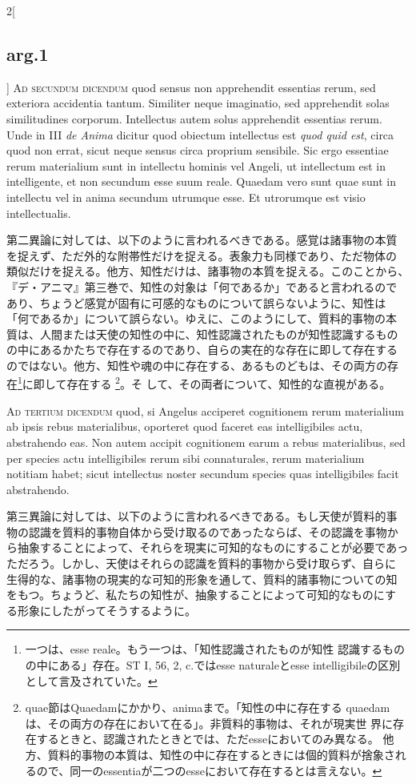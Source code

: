 \documentclass[paper=a4paper,fontsize=10pt,jafontsize=9pt,titlepage]{jlreq}
\begin{document}
\begin{paracol}{2}[\subsection{arg.1}]
{\scshape Ad secundum dicendum} quod sensus non apprehendit essentias
rerum, sed exteriora accidentia tantum. Similiter neque imaginatio,
sed apprehendit solas similitudines corporum. Intellectus autem solus
apprehendit essentias rerum. Unde in III {\itshape de Anima} dicitur
quod obiectum intellectus est {\itshape quod quid est}, circa quod non
errat, sicut neque sensus circa proprium sensibile. Sic ergo essentiae
rerum materialium sunt in intellectu hominis vel Angeli, ut
intellectum est in intelligente, et non secundum esse suum
reale. Quaedam vero sunt quae sunt in intellectu vel in anima secundum
utrumque esse. Et utrorumque est visio intellectualis.

\switchcolumn

第二異論に対しては、以下のように言われるべきである。感覚は諸事物の本質
を捉えず、ただ外的な附帯性だけを捉える。表象力も同様であり、ただ物体の
類似だけを捉える。他方、知性だけは、諸事物の本質を捉える。このことから、
『デ・アニマ』第三巻で、知性の対象は「何であるか」であると言われるので
あり、ちょうど感覚が固有に可感的なものについて誤らないように、知性は
「何であるか」について誤らない。ゆえに、このようにして、質料的事物の本
質は、人間または天使の知性の中に、知性認識されたものが知性認識するもの
の中にあるかたちで存在するのであり、自らの実在的な存在に即して存在する
のではない。他方、知性や魂の中に存在する、あるものどもは、その両方の存
在\footnote{一つは、esse reale。もう一つは、「知性認識されたものが知性
認識するものの中にある」存在。ST I, 56, 2, c.ではesse naturaleとesse
intelligibileの区別として言及されていた。}に即して存在する
\footnote{quae節はQuaedamにかかり、animaまで。「知性の中に存在する
quaedamは、その両方の存在において在る」。非質料的事物は、それが現実世
界に存在するときと、認識されたときとでは、ただesseにおいてのみ異なる。
他方、質料的事物の本質は、知性の中に存在するときには個的質料が捨象され
るので、同一のessentiaが二つのesseにおいて存在するとは言えない。}。そ
して、その両者について、知性的な直視がある。

\switchcolumn*[\subsection{ad.3}]

{\scshape Ad tertium dicendum} quod, si Angelus acciperet cognitionem
rerum materialium ab ipsis rebus materialibus, oporteret quod faceret
eas intelligibiles actu, abstrahendo eas. Non autem accipit
cognitionem earum a rebus materialibus, sed per species actu
intelligibiles rerum sibi connaturales, rerum materialium notitiam
habet; sicut intellectus noster secundum species quas intelligibiles
facit abstrahendo.

\switchcolumn

第三異論に対しては、以下のように言われるべきである。もし天使が質料的事
物の認識を質料的事物自体から受け取るのであったならば、その認識を事物か
ら抽象することによって、それらを現実に可知的なものにすることが必要であっ
ただろう。しかし、天使はそれらの認識を質料的事物から受け取らず、自らに
生得的な、諸事物の現実的な可知的形象を通して、質料的諸事物についての知
をもつ。ちょうど、私たちの知性が、抽象することによって可知的なものにす
る形象にしたがってそうするように。

\end{paracol}
\end{document}
